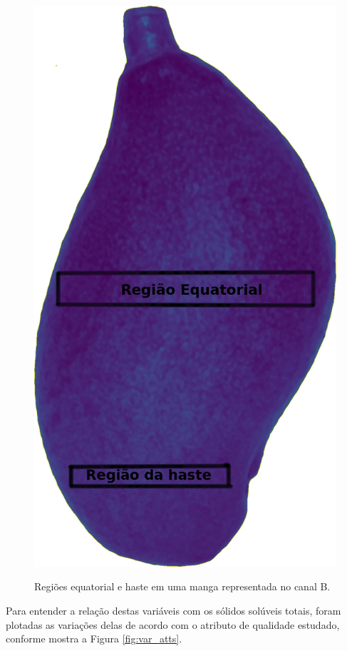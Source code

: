 \begin{figure}[H]
\centering
	\caption{Regiões equatorial e haste em uma manga representada no canal B.}
	\includegraphics[scale=0.17]{img/B_img.jpg}
	\label{fig:equator_stalk_b}
\end{figure}

Para entender a relação destas variáveis com os sólidos solúveis totais, foram plotadas as variações delas de acordo com o atributo de qualidade estudado, conforme mostra a Figura \ref{fig:var_atts}.

